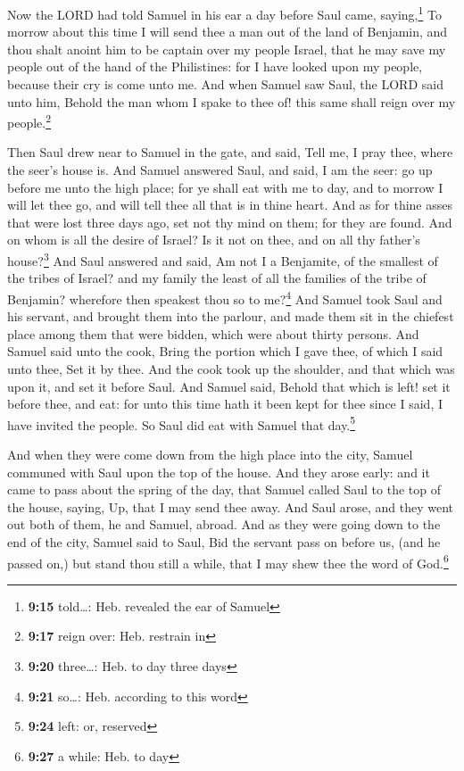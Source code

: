 Now the LORD had told Samuel in his ear a day before
Saul came, saying,\footnote{\textbf{9:15} told\ldots: Heb. revealed the
  ear of Samuel}  To morrow about this time I will send
thee a man out of the land of Benjamin, and thou shalt anoint him to be
captain over my people Israel, that he may save my people out of the
hand of the Philistines: for I have looked upon my people, because their
cry is come unto me.  And when Samuel saw Saul, the LORD
said unto him, Behold the man whom I spake to thee of! this same shall
reign over my people.\footnote{\textbf{9:17} reign over: Heb. restrain
  in}

 Then Saul drew near to Samuel in the gate, and said,
Tell me, I pray thee, where the seer's house is.  And
Samuel answered Saul, and said, I am the seer: go up before me unto the
high place; for ye shall eat with me to day, and to morrow I will let
thee go, and will tell thee all that is in thine heart. 
And as for thine asses that were lost three days ago, set not thy mind
on them; for they are found. And on whom is all the desire of Israel? Is
it not on thee, and on all thy father's house?\footnote{\textbf{9:20}
  three\ldots: Heb. to day three days}  And Saul answered
and said, Am not I a Benjamite, of the smallest of the tribes of Israel?
and my family the least of all the families of the tribe of Benjamin?
wherefore then speakest thou so to me?\footnote{\textbf{9:21} so\ldots:
  Heb. according to this word}  And Samuel took Saul and
his servant, and brought them into the parlour, and made them sit in the
chiefest place among them that were bidden, which were about thirty
persons.  And Samuel said unto the cook, Bring the
portion which I gave thee, of which I said unto thee, Set it by thee.
 And the cook took up the shoulder, and that which was
upon it, and set it before Saul. And Samuel said, Behold that which is
left! set it before thee, and eat: for unto this time hath it been kept
for thee since I said, I have invited the people. So Saul did eat with
Samuel that day.\footnote{\textbf{9:24} left: or, reserved}

 And when they were come down from the high place into
the city, Samuel communed with Saul upon the top of the house.
 And they arose early: and it came to pass about the
spring of the day, that Samuel called Saul to the top of the house,
saying, Up, that I may send thee away. And Saul arose, and they went out
both of them, he and Samuel, abroad.  And as they were
going down to the end of the city, Samuel said to Saul, Bid the servant
pass on before us, (and he passed on,) but stand thou still a while,
that I may shew thee the word of God.\footnote{\textbf{9:27} a while:
  Heb. to day}

